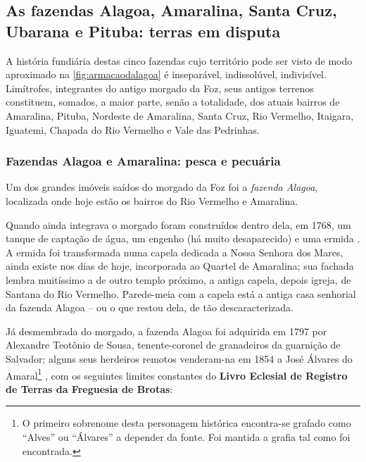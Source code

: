\subsection{As fazendas Alagoa, Amaralina, Santa Cruz, Ubarana e Pituba: terras em disputa}\label{subsec:alagoaamaralina}

A história fundiária destas cinco fazendas cujo território pode ser visto de modo aproximado na \autoref{fig:armacaodalagoa} é inseparável, indissolúvel, indivisível. Limítrofes, integrantes do antigo morgado da Foz, seus antigos terrenos constituem, somados, a maior parte, senão a totalidade, dos atuais bairros de Amaralina, Pituba, Nordeste de Amaralina, Santa Cruz, Rio Vermelho, Itaigara, Iguatemi, Chapada do Rio Vermelho e Vale das Pedrinhas.

\subsubsection{Fazendas Alagoa e Amaralina: pesca e pecuária}

Um dos grandes imóveis saídos do morgado da Foz foi a \textit{fazenda Alagoa}, localizada onde hoje estão os bairros do Rio Vermelho e Amaralina.

Quando ainda integrava o morgado foram construídos dentro dela, em 1768, um tanque de captação de água, um engenho (há muito desaparecido) e uma ermida \cite[p.~118]{campos_alagoa_1942}. A ermida foi transformada numa capela dedicada a Nossa Senhora dos Mares, ainda existe nos dias de hoje, incorporada ao Quartel de Amaralina; sua fachada lembra muitíssimo a de outro templo próximo, a antiga capela, depois igreja, de Santana do Rio Vermelho. Parede-meia com a capela está a antiga casa senhorial da fazenda Alagoa -- ou o que restou dela, de tão descaracterizada.

Já desmembrada do morgado, a fazenda Alagoa foi adquirida em 1797 por Alexandre Teotônio de Sousa, tenente-coronel de granadeiros da guarnição de Salvador; alguns seus herdeiros remotos venderam-na em 1854 a José Álvares do Amaral\footnote{O primeiro sobrenome desta personagem histórica encontra-se grafado como ``Alves'' ou ``Álvares'' a depender da fonte. Foi mantida a grafia tal como foi encontrada.} \cite[p.~118]{campos_alagoa_1942}, com os seguintes limites constantes do \textbf{Livro Eclesial de Registro de Terras da Freguesia de Brotas}:

